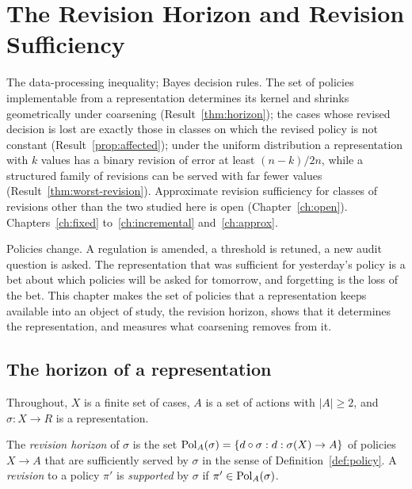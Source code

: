 \chapter{The Revision Horizon and Revision Sufficiency}\label{ch:revision}
{The data-processing inequality; Bayes decision rules.}
{The set of policies implementable from a representation determines its kernel and shrinks geometrically under coarsening (Result~\ref{thm:horizon}); the cases whose revised decision is lost are exactly those in classes on which the revised policy is not constant (Result~\ref{prop:affected}); under the uniform distribution a representation with $k$ values has a binary revision of error at least $(n-k)/2n$, while a structured family of revisions can be served with far fewer values (Result~\ref{thm:worst-revision}).}
{Approximate revision sufficiency for classes of revisions other than the two studied here is open (Chapter~\ref{ch:open}).}
{Chapters~\ref{ch:fixed} to~\ref{ch:incremental} and~\ref{ch:approx}.}

Policies change. A regulation is amended, a threshold is retuned, a new audit question is asked. The representation that was sufficient for yesterday's policy is a bet about which policies will be asked for tomorrow, and forgetting is the loss of the bet. This chapter makes the set of policies that a representation keeps available into an object of study, the revision horizon, shows that it determines the representation, and measures what coarsening removes from it.

\section{The horizon of a representation}

Throughout, $X$ is a finite set of cases, $A$ is a set of actions with $|A|\ge2$, and $\sigma:X\to R$ is a representation.

\begin{definition}\label{def:horizon}
The \emph{revision horizon} of $\sigma$ is the set $\mathrm{Pol}_A(\sigma)=\{d\circ\sigma: d:\sigma(X)\to A\}$ of policies $X\to A$ that are sufficiently served by $\sigma$ in the sense of Definition~\ref{def:policy}. A \emph{revision} to a policy $\pi'$ is \emph{supported} by $\sigma$ if $\pi'\in\mathrm{Pol}_A(\sigma)$.
\end{definition}

